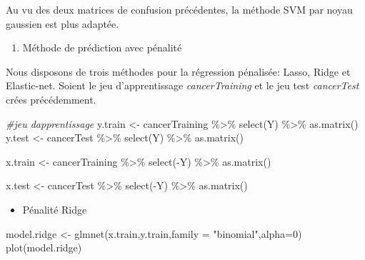 \documentclass[
  12pt,
]{article}
\newenvironment{Shaded}{\begin{snugshade}}{\end{snugshade}}
\newcommand{\AttributeTok}[1]{\textcolor[rgb]{0.77,0.63,0.00}{#1}}
\newcommand{\CommentTok}[1]{\textcolor[rgb]{0.56,0.35,0.01}{\textit{#1}}}
\newcommand{\DecValTok}[1]{\textcolor[rgb]{0.00,0.00,0.81}{#1}}
\newcommand{\FunctionTok}[1]{\textcolor[rgb]{0.00,0.00,0.00}{#1}}
\newcommand{\NormalTok}[1]{#1}
\newcommand{\OtherTok}[1]{\textcolor[rgb]{0.56,0.35,0.01}{#1}}
\newcommand{\SpecialCharTok}[1]{\textcolor[rgb]{0.00,0.00,0.00}{#1}}
\newcommand{\StringTok}[1]{\textcolor[rgb]{0.31,0.60,0.02}{#1}}
\providecommand{\tightlist}{%
  \setlength{\itemsep}{0pt}\setlength{\parskip}{0pt}}
\begin{document}
Au vu des deux matrices de confusion précédentes, la méthode SVM par
noyau gaussien est plus adaptée.

\begin{enumerate}
\def\labelenumi{\arabic{enumi}.}
\setcounter{enumi}{2}
\tightlist
\item
  Méthode de prédiction avec pénalité
\end{enumerate}

Nous disposons de trois méthodes pour la régression pénalisée: Lasso,
Ridge et Elastic-net. Soient le jeu d'apprentissage
\emph{cancerTraining} et le jeu test \emph{cancerTest} crées
précédemment.

\begin{Shaded}
\begin{Highlighting}[]
\CommentTok{\#jeu d\textquotesingle{}apprentissage }
\NormalTok{y.train }\OtherTok{\textless{}{-}}\NormalTok{ cancerTraining }\SpecialCharTok{\%\textgreater{}\%} 
  \FunctionTok{select}\NormalTok{(Y) }\SpecialCharTok{\%\textgreater{}\%}
  \FunctionTok{as.matrix}\NormalTok{()}
\NormalTok{y.test }\OtherTok{\textless{}{-}}\NormalTok{ cancerTest }\SpecialCharTok{\%\textgreater{}\%} 
  \FunctionTok{select}\NormalTok{(Y) }\SpecialCharTok{\%\textgreater{}\%} 
  \FunctionTok{as.matrix}\NormalTok{()}

\NormalTok{x.train }\OtherTok{\textless{}{-}}\NormalTok{ cancerTraining }\SpecialCharTok{\%\textgreater{}\%} 
  \FunctionTok{select}\NormalTok{(}\SpecialCharTok{{-}}\NormalTok{Y) }\SpecialCharTok{\%\textgreater{}\%} 
  \FunctionTok{as.matrix}\NormalTok{()}

\NormalTok{x.test }\OtherTok{\textless{}{-}}\NormalTok{ cancerTest }\SpecialCharTok{\%\textgreater{}\%} 
  \FunctionTok{select}\NormalTok{(}\SpecialCharTok{{-}}\NormalTok{Y) }\SpecialCharTok{\%\textgreater{}\%} 
  \FunctionTok{as.matrix}\NormalTok{()}
\end{Highlighting}
\end{Shaded}

\begin{itemize}
\tightlist
\item
  Pénalité Ridge
\end{itemize}

\begin{Shaded}
\begin{Highlighting}[]
\NormalTok{model.ridge }\OtherTok{\textless{}{-}} \FunctionTok{glmnet}\NormalTok{(x.train,y.train,}\AttributeTok{family =} \StringTok{"binomial"}\NormalTok{,}\AttributeTok{alpha=}\DecValTok{0}\NormalTok{)}
\FunctionTok{plot}\NormalTok{(model.ridge)}
\end{Highlighting}
\end{Shaded}
\end{document}
